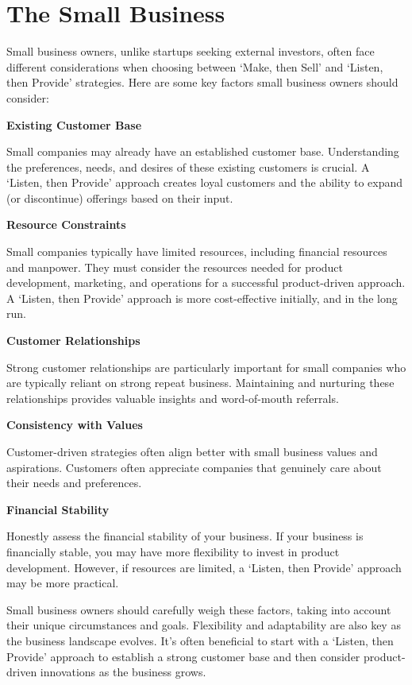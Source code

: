 \documentclass[
]{book}
\begin{document}
\hypertarget{the-small-business}{%
\section{The Small Business}\label{the-small-business}}

Small business owners, unlike startups seeking external investors, often face different considerations when choosing between { `Make, then Sell'} and {`Listen, then Provide'} strategies. Here are some key factors small business owners should consider:

\textbf{Existing Customer Base}

Small companies may already have an established customer base. Understanding the preferences, needs, and desires of these existing customers is crucial. A {`Listen, then Provide'} approach creates loyal customers and the ability to expand (or discontinue) offerings based on their input.

\textbf{Resource Constraints}

Small companies typically have limited resources, including financial resources and manpower. They must consider the resources needed for product development, marketing, and operations for a successful product-driven approach. A {`Listen, then Provide'} approach is more cost-effective initially, and in the long run.

\textbf{Customer Relationships}

Strong customer relationships are particularly important for small companies who are typically reliant on strong repeat business. Maintaining and nurturing these relationships provides valuable insights and word-of-mouth referrals.

\textbf{Consistency with Values}

Customer-driven strategies often align better with small business values and aspirations. Customers often appreciate companies that genuinely care about their needs and preferences.

\textbf{Financial Stability}

Honestly assess the financial stability of your business. If your business is financially stable, you may have more flexibility to invest in product development. However, if resources are limited, a {`Listen, then Provide'} approach may be more practical.

Small business owners should carefully weigh these factors, taking into account their unique circumstances and goals. Flexibility and adaptability are also key as the business landscape evolves. It's often beneficial to start with a {`Listen, then Provide'} approach to establish a strong customer base and then consider product-driven innovations as the business grows.
\end{document}
